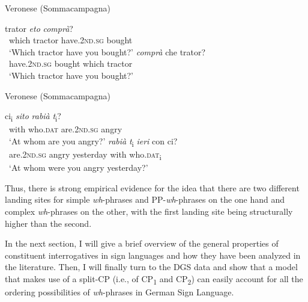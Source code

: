 \begin{exe}
\ex Veronese (Sommacampagna)\label{morenorthernitaliana}\begin{xlist}
\ex{} {trator} {\textit{eto}} {\textit{comprà}?} \\
{\textcolor{white}{*}which} {tractor} {have.\textsc{2nd.sg}} {bought}  \\
\trans \textcolor{white}{*}`Which tractor have you bought?' \label{morenorthernitalianaa} 
\ex{} {\textit{comprà}} {che} {trator?} \\
{\textcolor{white}{*}have.\textsc{2nd.sg}} {bought} {which} {tractor}  \\
\trans \textcolor{white}{*}`Which tractor have you bought?' \label{morenorthernitalianab} 
\end{xlist}
\end{exe}



\begin{exe}
\ex Veronese (Sommacampagna)\label{morenorthernitalianb}\begin{xlist}
\ex{} {ci\textsubscript{i}} {\textit{sito}} {\textit{rabià}} {\textit{t}\textsubscript{i}?}  \\
{\textcolor{white}{*}with} {who.\textsc{dat}} {are.\textsc{2nd.sg}} {angry} {} \\
\trans \textcolor{white}{*}`At whom are you angry?' \label{morenorthernitalianba} 
\ex{} {\textit{rabià}} {\textit{t}\textsubscript{i}} {\textit{ieri}} {con} {ci?}  \\
{\textcolor{white}{*}are.\textsc{2nd.sg}} {angry} {} {yesterday} {with} {who.\textsc{dat}\textsubscript{i}}\\
\trans \textcolor{white}{*}`At whom were you angry yesterday?' \label{morenorthernitalianbb} 
\end{xlist}
\end{exe}

\noindent Thus, there is strong empirical evidence for the idea that there are two different landing sites for simple \textit{wh}-phrases and PP-\textit{wh}-phrases on the one hand and complex \textit{wh}-phrases on the other, with the first landing site being structurally higher than the second. 

In the next section, I will give a brief overview of the general properties of constituent interrogatives in sign languages and how they have been analyzed in the literature. Then, I will finally turn to the DGS data and show that a model that makes use of a split-CP (i.e., of CP\textsubscript{1} and CP\textsubscript{2}) can easily account for all the ordering possibilities of \textit{wh}-phrases in German Sign Language. 

